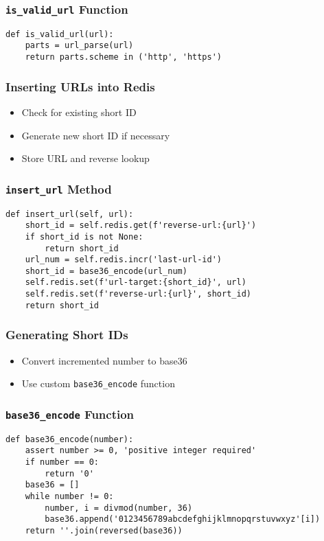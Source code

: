\documentclass{beamer}
\begin{document}
\begin{frame}[fragile]
\frametitle{\texttt{is\_valid\_url} Function}
\begin{verbatim}
def is_valid_url(url):
    parts = url_parse(url)
    return parts.scheme in ('http', 'https')
\end{verbatim}
\end{frame}

\begin{frame}
\frametitle{Inserting URLs into Redis}
\begin{itemize}
    \item Check for existing short ID
    \item Generate new short ID if necessary
    \item Store URL and reverse lookup
\end{itemize}
\end{frame}
\begin{frame}[fragile]
\frametitle{\texttt{insert\_url} Method}
\begin{verbatim}
def insert_url(self, url):
    short_id = self.redis.get(f'reverse-url:{url}')
    if short_id is not None:
        return short_id
    url_num = self.redis.incr('last-url-id')
    short_id = base36_encode(url_num)
    self.redis.set(f'url-target:{short_id}', url)
    self.redis.set(f'reverse-url:{url}', short_id)
    return short_id
\end{verbatim}
\end{frame}

\begin{frame}
\frametitle{Generating Short IDs}
\begin{itemize}
    \item Convert incremented number to base36
    \item Use custom \texttt{base36\_encode} function
\end{itemize}
\end{frame}

\begin{frame}[fragile]
\frametitle{\texttt{base36\_encode} Function}
\begin{verbatim}
def base36_encode(number):
    assert number >= 0, 'positive integer required'
    if number == 0:
        return '0'
    base36 = []
    while number != 0:
        number, i = divmod(number, 36)
        base36.append('0123456789abcdefghijklmnopqrstuvwxyz'[i])
    return ''.join(reversed(base36))
\end{verbatim}
\end{frame}
\end{document}
